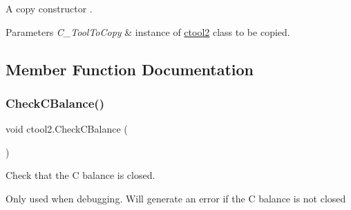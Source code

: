 A copy constructor . 


\begin{DoxyParams}{Parameters}
{\em C\+\_\+\+Tool\+To\+Copy} & instance of \mbox{\hyperlink{classctool2}{ctool2}} class to be copied. \\
\hline
\end{DoxyParams}


\subsection{Member Function Documentation}
\mbox{\label{classctool2_ab9e6dc7d7c67b8956d4d5284c32c881b}} 
\subsubsection{\texorpdfstring{CheckCBalance()}{CheckCBalance()}}
{\footnotesize\ttfamily void ctool2.\+Check\+C\+Balance (\begin{DoxyParamCaption}{ }\end{DoxyParamCaption})\hspace{0.3cm}{\ttfamily [inline]}}



Check that the C balance is closed. 

Only used when debugging. Will generate an error if the C balance is not closed \mbox{\label{classctool2_a9443a20fe2c0134438a7e03c9821cee0}} 
